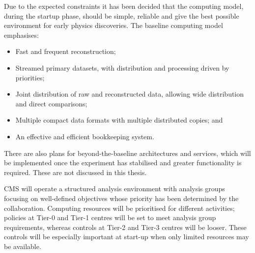 Due to the expected constraints it has been decided that the computing model, during the startup phase, should be simple, reliable and give the best possible environment for early physics discoveries. The baseline computing model emphasises:
\begin{itemize}
\item Fast and frequent reconstruction;
\item Streamed primary datasets, with distribution and processing driven by priorities;
\item Joint distribution of raw and reconstructed data, allowing wide distribution and direct comparisons;
\item Multiple compact data formats with multiple distributed copies; and
\item An effective and efficient bookkeeping system.
\end{itemize}
There are also plans for beyond-the-baseline architectures and services, which will be implemented once the experiment has stabilised and greater functionality is required. These are not discussed in this thesis.

CMS will operate a structured analysis environment with analysis groups focusing on well-defined objectives whose priority has been determined by the collaboration. Computing resources will be prioritised for different activities; policies at Tier-0 and Tier-1 centres will be set to meet analysis group requirements, whereas controls at Tier-2 and Tier-3 centres will be looser. These controls will be especially important at start-up when only limited resources may be available.

